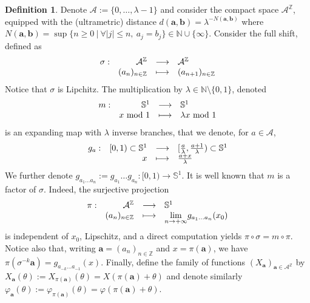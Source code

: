 \documentclass[11pt]{amsart}
\theoremstyle{plain}
\theoremstyle{definition}
\newtheorem{definition}[theorem]{Definition}
\numberwithin{equation}{section}
\begin{document}
\begin{definition}
Denote $\mathcal{A} := \{0,\dots,\lambda-1\}$ and consider the compact space $\mathcal{A}^\mathbb{Z}$, equipped with the (ultrametric) distance $d(\mathbf{a},\mathbf{b}) = \lambda^{- N(\mathbf{a},\mathbf{b})}$ where $N(\mathbf{a},\mathbf{b}) = \sup\{ n \geq 0 \ | \ \forall |j| \leq n, \ a_j = b_j \} \in \mathbb{N} \cup \{\infty\}$. Consider the full shift, defined as  
 $$ \begin{array}[t]{lrcl}
\sigma : & \mathcal{A}^\mathbb{Z} & \longrightarrow & \mathcal{A}^\mathbb{Z} \\
    & (a_n)_{n \in \mathbb{Z}}  & \longmapsto &  (a_{n+1})_{n \in \mathbb{Z}}  \end{array} $$
Notice that $\sigma$ is Lipchitz. The multiplication by $\lambda \in \mathbb{N} \setminus \{0,1\}$, denoted $$ \begin{array}[t]{lrcl}
m : & \mathbb{S}^1 & \longrightarrow & \mathbb{S}^1 \\
    & x \text{ mod } 1  & \longmapsto &  \lambda x \text{ mod } 1  \end{array} $$
is an expanding map with $\lambda$ inverse branches, that we denote, for $a \in \mathcal{A}$, $$ \begin{array}[t]{lrcl}
g_a : & [0,1) \subset \mathbb{S}^1 & \longrightarrow & [\frac{a}{\lambda},\frac{a+1}{\lambda}) \subset \mathbb{S}^1 \\
    & x  & \longmapsto &  \frac{a+x}{\lambda}  \end{array} $$
We further denote $g_{a_1 \dots a_n} := g_{a_1} \dots g_{a_n} : [0,1) \rightarrow \mathbb{S}^1$. It is well known that $m$ is a factor of $\sigma$. Indeed, the surjective projection $$\begin{array}[t]{lrcl}
 \pi : & \mathcal{A}^\mathbb{Z} & \longrightarrow & \mathbb{S}^1 \\
    & (a_n)_{n \in \mathbb{Z}}  & \longmapsto & \underset{n \rightarrow +\infty}{\lim} g_{a_1\dots a_n}(x_0)  \end{array} $$ 
is independent of $x_0$, Lipschitz, and a direct computation yields $\pi \circ \sigma = m \circ \pi$. Notice also that, writing $\mathbf{a} = (a_n)_{n \in \mathbb{Z}}$ and $x=\pi(\mathbf{a})$, we have $\pi(\sigma^{-k} \mathbf{a}) = g_{a_{-k} \dots a_{-1}}(x)$. Finally, define the family of functions $(X_\mathbf{a})_{\mathbf{a} \in \mathcal{A}^\mathbb{Z}}$ by $X_{\mathbf{a}}(\theta) := X_{\pi(\mathbf{a})}(\theta) = X(\pi(\mathbf{a})+\theta)$ and denote similarly $\varphi_\mathbf{a}(\theta) := \varphi_{\pi(\mathbf{a})}(\theta) = \varphi(\pi(\mathbf{a})+\theta)$.
\end{definition}
\end{document}
